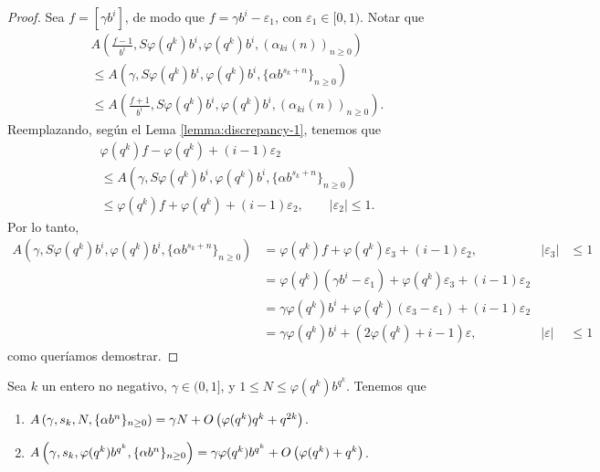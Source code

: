 \begin{proof}
Sea $f = [\gamma b^i]$, de modo que $f = \gamma b^i - \varepsilon_1$, con
$\varepsilon_1 \in [0, 1)$. Notar que
\begin{multline*}
	A\left(\frac{f-1}{b^i}, S \varphi(q^k) b^i, \varphi(q^k) b^i,
		\left(\alpha_{ki}(n)\right)_{n\geq0} \right) \\
	\leq A\left(\gamma, S \varphi(q^k) b^i, \varphi(q^k) b^i,
		\lbrace \alpha b^{s_k + n} \rbrace_{n\geq0} \right) \\
	\leq A\left(\frac{f+1}{b^i}, S \varphi(q^k) b^i, \varphi(q^k) b^i,
		\left(\alpha_{ki}(n)\right)_{n\geq0} \right).
\end{multline*}
Reemplazando, según el Lema \ref{lemma:discrepancy-1}, tenemos que
\begin{multline*}
	\varphi(q^k)f - \varphi(q^k) + (i - 1)\varepsilon_2 \\
	\leq A\left(\gamma, S \varphi(q^k) b^i, \varphi(q^k) b^i,
		\lbrace \alpha b^{s_k + n} \rbrace_{n\geq0} \right) \\
	\leq \varphi(q^k)f + \varphi(q^k) + (i - 1)\varepsilon_2,
	\qquad \vert \varepsilon_2 \vert \leq 1.
\end{multline*}
Por lo tanto,
\begin{align*}
	A\left(\gamma, S \varphi(q^k) b^i, \varphi(q^k) b^i,
		\lbrace \alpha b^{s_k + n} \rbrace_{n\geq0} \right)
		&= \varphi(q^k)f + \varphi(q^k)\varepsilon_3 + (i - 1)\varepsilon_2,
			& \vert \varepsilon_3 \vert &\leq 1 \\
		&= \varphi(q^k)(\gamma b^i - \varepsilon_1) + \varphi(q^k)\varepsilon_3
			+ (i - 1)\varepsilon_2 \\
		&= \gamma\varphi(q^k)b^i + \varphi(q^k)(\varepsilon_3 - \varepsilon_1)
			+ (i - 1)\varepsilon_2 \\
		&= \gamma\varphi(q^k)b^i + (2\varphi(q^k) + i - 1)\varepsilon,
			& \vert\varepsilon\vert & \leq 1
\end{align*}
como queríamos demostrar.
\end{proof}

\begin{lemma}
	\label{lemma:discrepancy-3}
	Sea $k$ un entero no negativo, $\gamma \in (0, 1]$,
	y $1 \leq N \leq \varphi(q^k)b^{q^k}$.
	Tenemos que
	\begin{enumerate}
		\item $ A\left(\gamma, s_k, N, \lbrace \alpha b^{n} \rbrace_{n\geq0} \right) =
			\gamma N + O \left( \varphi(q^k)q^k + q^{2k} \right)$.
		\item $ A\left(\gamma, s_k, \varphi(q^k)b^{q^k}, \lbrace \alpha b^{n} \rbrace_{n\geq0} \right) =
			\gamma\varphi(q^k)b^{q^k} + O\left(\varphi(q^k) + q^k\right)$.
	\end{enumerate}
\end{lemma}

